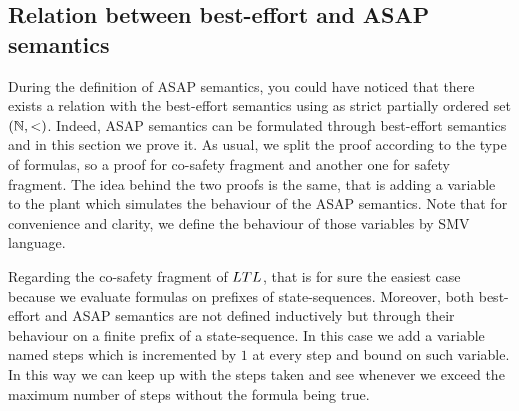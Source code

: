 
\subsection{Relation between best-effort and ASAP semantics} \label{subsec:relation-best-effort-asap}
During the definition of ASAP semantics, you could have noticed that there exists a relation with the best-effort semantics using as strict partially ordered set $\left( \mathbb{N},< \right)$.
Indeed, ASAP semantics can be formulated through best-effort semantics and in this section we prove it. As usual, we split the proof according to the type of formulas, so a proof for co-safety fragment and another one for safety fragment.
The idea behind the two proofs is the same, that is adding a variable to the plant which simulates the behaviour of the ASAP semantics.
Note that for convenience and clarity, we define the behaviour of those variables by SMV language.

Regarding the co-safety fragment of $LTL$, that is for sure the easiest case because we evaluate formulas on prefixes of state-sequences.
Moreover, both best-effort and ASAP semantics are not defined inductively but through their behaviour on a finite prefix of a state-sequence.
In this case we add a variable named steps which is incremented by $1$ at every step and bound on such variable. 
In this way we can keep up with the steps taken and see whenever we exceed the maximum number of steps without the formula being true.

